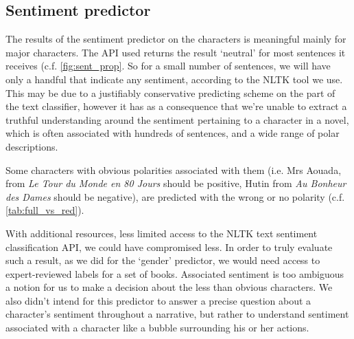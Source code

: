 \subsection{Sentiment predictor}
The results of the sentiment predictor on the characters is meaningful mainly for major characters. The API used returns the result `neutral' for most sentences it receives (c.f. \cref{fig:sent_prop}. So for a small number of sentences, we will have only a handful that indicate any sentiment, according to the NLTK tool we use. This may be due to a justifiably conservative predicting scheme on the part of the text classifier, however it has as a consequence that we're unable to extract a truthful understanding around the sentiment pertaining to a character in a novel, which is often associated with hundreds of sentences, and a wide range of polar descriptions.

Some characters with obvious polarities associated with them (i.e. Mrs Aouada, from \textit{Le Tour du Monde en 80 Jours} should be positive, Hutin from \textit{Au Bonheur des Dames} should be negative), are predicted with the wrong or no polarity (c.f. \cref{tab:full_vs_red}). 

With additional resources, less limited access to the NLTK text sentiment classification API, we could have compromised less. In order to truly evaluate such a result, as we did for the `gender' predictor, we would need access to expert-reviewed labels for a set of books. Associated sentiment is too ambiguous a notion for us to make a decision about the less than obvious characters. We also didn't intend for this predictor to answer a precise question about a character's sentiment throughout a narrative, but rather to understand sentiment associated with a character like a bubble surrounding his or her actions. 

